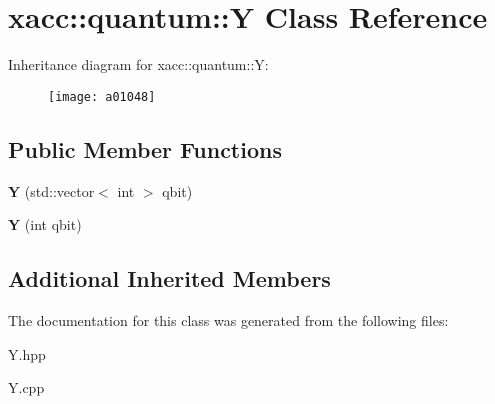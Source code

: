 \hypertarget{a01048}{}\section{xacc\+:\+:quantum\+:\+:Y Class Reference}
\label{a01048}
Inheritance diagram for xacc\+:\+:quantum\+:\+:Y\+:\begin{figure}[H]
\begin{center}
\leavevmode
\texttt{[image: a01048]}
\end{center}
\end{figure}
\subsection*{Public Member Functions}
\begin{DoxyCompactItemize}
\item 
\mbox{\label{a01048_a7959be0aa8221c0b1ba445771f5ecf0a}} 
{\bfseries Y} (std\+::vector$<$ int $>$ qbit)
\item 
\mbox{\label{a01048_aea2b37ac45208cbf6a47e0074e4a9653}} 
{\bfseries Y} (int qbit)
\end{DoxyCompactItemize}
\subsection*{Additional Inherited Members}


The documentation for this class was generated from the following files\+:\begin{DoxyCompactItemize}
\item 
Y.\+hpp\item 
Y.\+cpp\end{DoxyCompactItemize}
